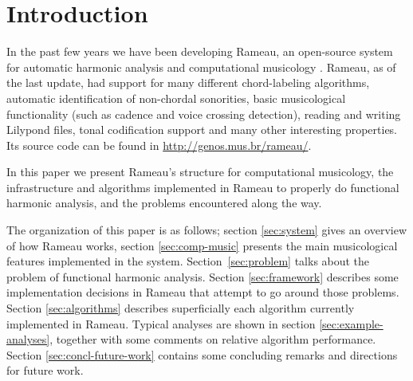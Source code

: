 
\section{Introduction}
\label{sec:introduction}

In the past few years we have been developing Rameau, an open-source
system for automatic harmonic analysis and computational musicology
\cite{kroger08:rameau}. Rameau, as of the last update, had support for
many different chord-labeling algorithms, automatic identification of
non-chordal sonorities, basic musicological functionality (such as
cadence and voice crossing detection), reading and writing Lilypond
\cite{nienhuys.ea08:lilypond} files, tonal codification support and
many other interesting properties. Its source code can be found in
\url{http://genos.mus.br/rameau/}.


In this paper we present Rameau's structure for computational
musicology, the infrastructure and algorithms implemented in Rameau to
properly do functional harmonic analysis, and the problems encountered
along the way.

The organization of this paper is as follows; section \ref{sec:system}
gives an overview of how Rameau works, section \ref{sec:comp-music}
presents the main musicological features implemented in the
system. Section~\ref{sec:problem} talks about the problem of
functional harmonic analysis. Section \ref{sec:framework} describes
some implementation decisions in Rameau that attempt to go around
those problems.  Section \ref{sec:algorithms} describes superficially
each algorithm currently implemented in Rameau. Typical analyses are
shown in section \ref{sec:example-analyses}, together with some
comments on relative algorithm performance. Section
\ref{sec:concl-future-work} contains some concluding remarks and
directions for future work. 

